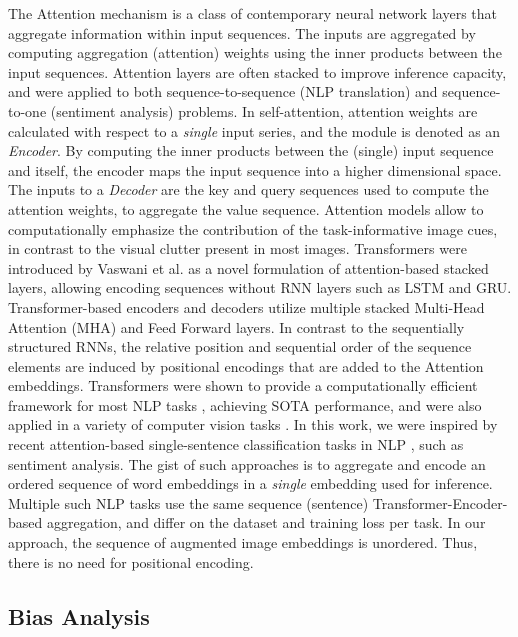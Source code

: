 \documentclass[10pt,journal]{IEEEtran}\usepackage{amsfonts}
\begin{document}
The Attention mechanism \cite{DBLP:journals/corr/BahdanauCB14} is a class of
contemporary neural network layers that aggregate information within input
sequences. The inputs are aggregated by computing aggregation (attention)
weights using the inner products between the input sequences. Attention layers
are often stacked to improve inference capacity, and were applied to both
sequence-to-sequence (NLP translation) and sequence-to-one (sentiment
analysis) problems. In self-attention, attention weights are calculated with
respect to a \textit{single} input series, and the module is denoted as an
\textit{Encoder}. By computing the inner products between the (single) input
sequence and itself, the encoder maps the input sequence into a higher
dimensional space. The inputs to a \textit{Decoder} are the key and query
sequences used to compute the attention weights, to aggregate the value
sequence. Attention models allow to computationally emphasize the contribution
of the task-informative image cues, in contrast to the visual clutter present
in most images. Transformers were introduced by Vaswani et al.
\cite{AttentionIsAllYouNeed} as a novel formulation of attention-based stacked
layers, allowing encoding sequences without RNN layers such as LSTM and GRU.
Transformer-based encoders and decoders utilize multiple stacked Multi-Head
Attention (MHA) and Feed Forward layers. In contrast to the sequentially
structured RNNs, the relative position and sequential order of the sequence
elements are induced by positional encodings that are added to the Attention
embeddings. Transformers were shown to provide a computationally efficient
framework for most NLP tasks \cite{bert}, achieving SOTA performance, and were
also applied in a variety of computer vision tasks \cite{DETR}. In this work,
we were inspired by recent attention-based single-sentence classification
tasks in NLP \cite{bert}, such as sentiment analysis. The gist of such
approaches is to aggregate and encode an ordered sequence of word embeddings
in a \textit{single} embedding used for inference. Multiple such NLP tasks
\cite{bert} use the same sequence (sentence) Transformer-Encoder-based
aggregation, and differ on the dataset and training loss per task. In our
approach, the sequence of augmented image embeddings is unordered. Thus, there
is no need for positional encoding.

\subsection{Bias Analysis}
\end{document}
